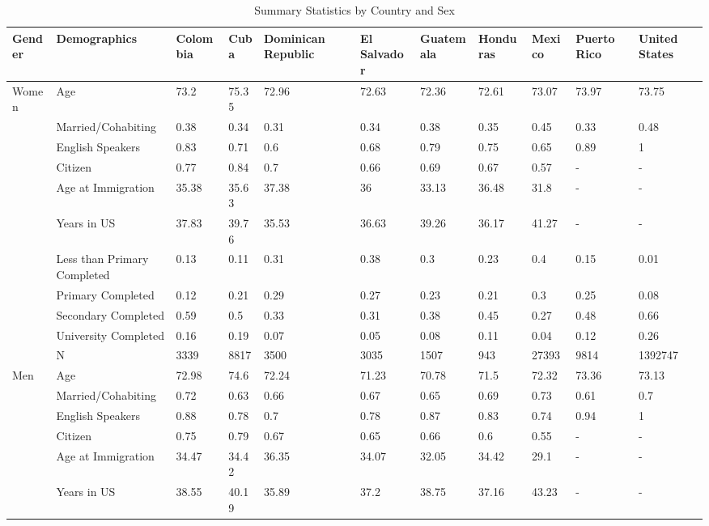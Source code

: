 \begin{table}[ht]
\centering
\caption{Summary Statistics by Country and Sex} 
\begingroup\small
\begin{tabular}{l|l|lllllllll}
  \hline
Gender & Demographics & Colombia & Cuba & Dominican Republic & El Salvador & Guatemala & Honduras & Mexico & Puerto Rico & United States \\ 
  \hline
Women & Age & 73.2 & 75.35 & 72.96 & 72.63 & 72.36 & 72.61 & 73.07 & 73.97 & 73.75 \\ 
   & Married/Cohabiting & 0.38 & 0.34 & 0.31 & 0.34 & 0.38 & 0.35 & 0.45 & 0.33 & 0.48 \\ 
   & English Speakers & 0.83 & 0.71 & 0.6 & 0.68 & 0.79 & 0.75 & 0.65 & 0.89 & 1 \\ 
   & Citizen & 0.77 & 0.84 & 0.7 & 0.66 & 0.69 & 0.67 & 0.57 & - & - \\ 
   & Age at Immigration & 35.38 & 35.63 & 37.38 & 36 & 33.13 & 36.48 & 31.8 & - & - \\ 
   & Years in US & 37.83 & 39.76 & 35.53 & 36.63 & 39.26 & 36.17 & 41.27 & - & - \\ 
   & Less than Primary Completed & 0.13 & 0.11 & 0.31 & 0.38 & 0.3 & 0.23 & 0.4 & 0.15 & 0.01 \\ 
   & Primary Completed & 0.12 & 0.21 & 0.29 & 0.27 & 0.23 & 0.21 & 0.3 & 0.25 & 0.08 \\ 
   & Secondary Completed & 0.59 & 0.5 & 0.33 & 0.31 & 0.38 & 0.45 & 0.27 & 0.48 & 0.66 \\ 
   & University Completed & 0.16 & 0.19 & 0.07 & 0.05 & 0.08 & 0.11 & 0.04 & 0.12 & 0.26 \\ 
   & N & 3339 & 8817 & 3500 & 3035 & 1507 & 943 & 27393 & 9814 & 1392747 \\ 
  Men & Age & 72.98 & 74.6 & 72.24 & 71.23 & 70.78 & 71.5 & 72.32 & 73.36 & 73.13 \\ 
   & Married/Cohabiting & 0.72 & 0.63 & 0.66 & 0.67 & 0.65 & 0.69 & 0.73 & 0.61 & 0.7 \\ 
   & English Speakers & 0.88 & 0.78 & 0.7 & 0.78 & 0.87 & 0.83 & 0.74 & 0.94 & 1 \\ 
   & Citizen & 0.75 & 0.79 & 0.67 & 0.65 & 0.66 & 0.6 & 0.55 & - & - \\ 
   & Age at Immigration & 34.47 & 34.42 & 36.35 & 34.07 & 32.05 & 34.42 & 29.1 & - & - \\ 
   & Years in US & 38.55 & 40.19 & 35.89 & 37.2 & 38.75 & 37.16 & 43.23 & - & - \\ 

\end{tabular}
\end{table}

